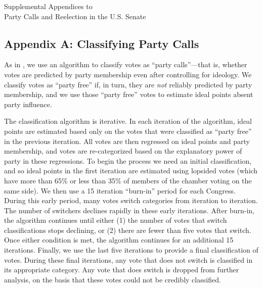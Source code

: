 \documentclass[12pt]{article}
\begin{document}
\doublespacing

\setcounter{table}{0}
\setcounter{footnote}{0}
\setcounter{figure}{0}
\setcounter{page}{0}


\begin{center}
\vspace*{1in}
{\Large Supplemental Appendices to\\}
{\LARGE Party Calls and Reelection in the U.S. Senate}
\end{center}
\vspace*{1in}

\thispagestyle{empty}

\setcounter{tocdepth}{1}
\setcounter{secnumdepth}{0}
\tableofcontents

\renewcommand\thetable{A\arabic{table}}
\renewcommand\thepage{A\arabic{page}}

\clearpage

\subsection*{Appendix A: Classifying Party Calls}
%

As in \cite{Minozzi:2013}, we use an algorithm to classify votes as ``party calls''---that is, whether votes are predicted by party membership even after controlling for ideology.  We classify votes as ``party free'' if, in turn, they are \textit{not} reliably predicted by party membership, and we use those ``party free'' votes to estimate ideal points absent party influence.

The classification algorithm is iterative.  In each iteration of the algorithm, ideal points are estimated based only on the votes that were classified as ``party free'' in the previous iteration.  All votes are then regressed on ideal points and party membership, and votes are re-categorized based on the explanatory power of party in these regressions.  To begin the process we need an initial classification, and so ideal points in the first iteration are estimated using lopsided votes (which have more than 65\% or less than 35\% of members of the chamber voting on the same side).  We then use a 15 iteration ``burn-in'' period for each Congress.
During this early period, many votes switch categories from iteration to iteration.
The number of switchers declines rapidly in these early iterations.
After burn-in, the algorithm continues until either (1) the number of votes that switch classifications stops declining, or (2) there are fewer than five votes that switch.  Once either condition is met, the algorithm continues for an additional 15 iterations.  Finally, we use the last five iterations to provide a final classification of votes. During these final iterations, any vote that does not switch is classified in its appropriate category.  Any vote that does switch is dropped from further analysis, on the basis that these votes could not be credibly classified.
\end{document}

